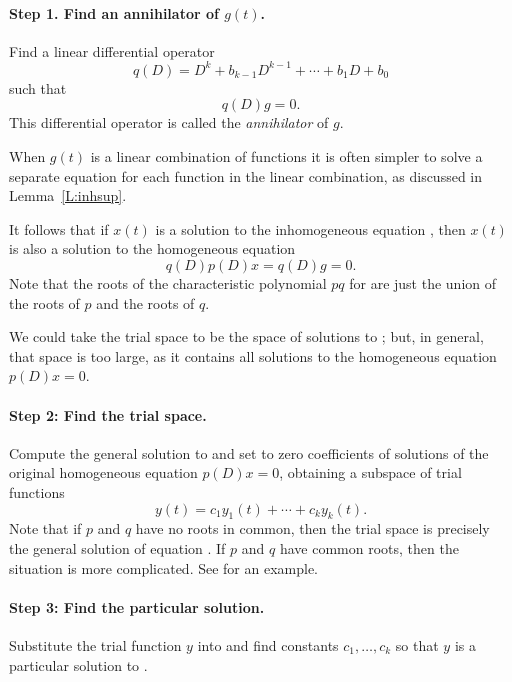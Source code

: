 \documentclass{ximera}
\begin{document}
\paragraph{Step 1. Find an annihilator of $g(t)$.} 
Find a linear differential operator 
\[
q(D) = D^k + b_{k-1}D^{k-1} + \cdots + b_1D+b_0
\]
such that 
\begin{equation}  \label{eq:undetcoeffb}
q(D)g = 0.
\end{equation}
This differential operator is called the {\em annihilator\/} of $g$. 

  When $g(t)$ is a linear combination of functions
it is often simpler to solve a separate equation for each function in the 
linear combination, as discussed in Lemma~\ref{L:inhsup}.

It follows that if $x(t)$ is a solution to the 
inhomogeneous equation , then $x(t)$ is 
also a solution to the homogeneous equation 
\begin{equation}  \label{E:prodode}
q(D)p(D)x = q(D)g = 0.
\end{equation}
Note that the roots of the 
characteristic 
polynomial 
$pq$ for 
are just the union of the roots of $p$ and the roots of $q$.  

We could take the trial space to 
be the space of solutions to ;
but, in general, that space is too large, as it contains all solutions to the 
homogeneous equation $p(D)x=0$.

\paragraph{Step 2: Find the trial space.} 
Compute the general solution to  and set to zero 
coefficients of solutions of 
the original homogeneous equation $p(D)x=0$, obtaining a subspace of trial 
functions
\[
y(t)=c_1 y_1(t) + \cdots + c_k y_k(t).
\]
Note that if $p$ and $q$ have no roots in common, then the trial space is 
precisely the general solution of equation .  If $p$ 
and $q$ have common roots, then the situation is more complicated.  See 
 for an example.

\paragraph{Step 3: Find the particular solution.} 
Substitute the trial function $y$ into  and find constants 
$c_1,\ldots,c_k$ so that $y$ is a particular solution to .
\end{document}
